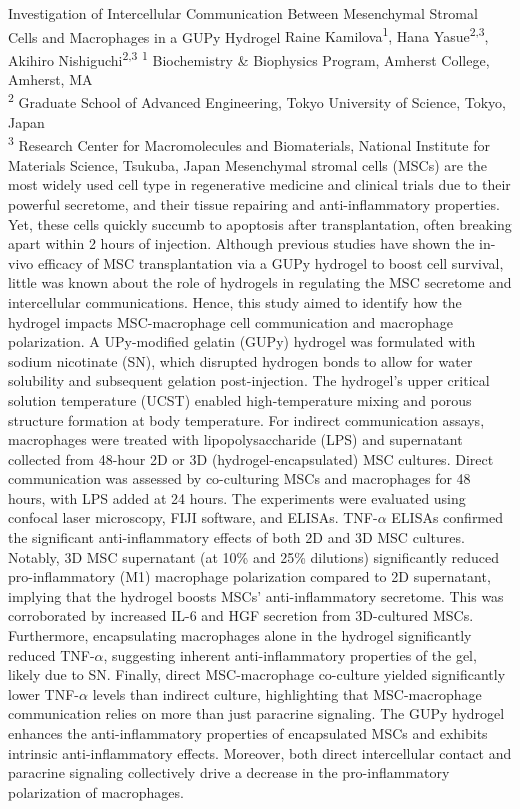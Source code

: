 \makeabstract
    {
    Investigation of Intercellular Communication Between Mesenchymal Stromal Cells and Macrophages in a GUPy Hydrogel
    }
    {
    Raine Kamilova\textsuperscript{1}, Hana Yasue\textsuperscript{2,3}, Akihiro Nishiguchi\textsuperscript{2,3}
    }
    {
    \textsuperscript{1} Biochemistry \& Biophysics Program, Amherst College, Amherst, MA\\
\textsuperscript{2} Graduate School of Advanced Engineering, Tokyo University of Science, Tokyo, Japan\\
\textsuperscript{3} Research Center for Macromolecules and Biomaterials, National Institute for Materials Science, Tsukuba, Japan
    }
    {
    Mesenchymal stromal cells (MSCs) are the most widely used cell type in regenerative medicine and clinical trials due to their powerful secretome, and their tissue repairing and anti-inflammatory properties. Yet, these cells quickly succumb to apoptosis after transplantation, often breaking apart within 2 hours of injection. Although previous studies have shown the in-vivo efficacy of MSC transplantation via a GUPy hydrogel to boost cell survival, little was known about the role of hydrogels in regulating the MSC secretome and intercellular communications. Hence, this study aimed to identify how the hydrogel impacts MSC-macrophage cell communication and macrophage polarization.
    }
    {
    A UPy-modified gelatin (GUPy) hydrogel was formulated with sodium nicotinate (SN), which disrupted hydrogen bonds to allow for water solubility and subsequent gelation post-injection. The hydrogel{\textquoteright}s upper critical solution temperature (UCST) enabled high-temperature mixing and porous structure formation at body temperature. For indirect communication assays, macrophages were treated with lipopolysaccharide (LPS) and supernatant collected from 48-hour 2D or 3D (hydrogel-encapsulated) MSC cultures. Direct communication was assessed by co-culturing MSCs and macrophages for 48 hours, with LPS added at 24 hours. The experiments were evaluated using confocal laser microscopy, FIJI software, and ELISAs.
    }
    {
    TNF-\ensuremath{\alpha} ELISAs confirmed the significant anti-inflammatory effects of both 2D and 3D MSC cultures. Notably, 3D MSC supernatant (at 10\% and 25\% dilutions) significantly reduced pro-inflammatory (M1) macrophage polarization compared to 2D supernatant, implying that the hydrogel boosts MSCs' anti-inflammatory secretome. This was corroborated by increased IL-6 and HGF secretion from 3D-cultured MSCs. Furthermore, encapsulating macrophages alone in the hydrogel significantly reduced TNF-\ensuremath{\alpha}, suggesting inherent anti-inflammatory properties of the gel, likely due to SN. Finally, direct MSC-macrophage co-culture yielded significantly lower TNF-\ensuremath{\alpha} levels than indirect culture, highlighting that MSC-macrophage communication relies on more than just paracrine signaling.
    }
    {
    The GUPy hydrogel enhances the anti-inflammatory properties of encapsulated MSCs and exhibits intrinsic anti-inflammatory effects. Moreover, both direct intercellular contact and paracrine signaling collectively drive a decrease in the pro-inflammatory polarization of macrophages.
    }

    \newpage
    